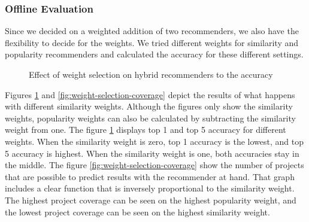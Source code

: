 \subsubsection{Offline Evaluation}

Since we decided on a weighted addition of two recommenders, we also have the flexibility to decide for the weights. We tried different weights for similarity and popularity recommenders and calculated the accuracy for these different settings. 


\begin{figure}[htp]
	\centering
	
	\exampleA
	\exampleB
	\caption[Weight figure]{Effect of weight selection on hybrid recommenders to the accuracy}\label{fig:weight-selection}
\end{figure}

Figures \ref{fig:weight-selection} and \ref{fig:weight-selection-coverage}  depict the results of what happens with different similarity weights. Although the figures only show the similarity weights, popularity weights can also be calculated by subtracting the similarity weight from one. The figure \ref{fig:weight-selection} displays top 1 and top 5 accuracy for different weights. When the similarity weight is zero, top 1 accuracy is the lowest, and top 5 accuracy is highest. When the similarity weight is one, both accuracies stay in the middle. The figure \ref{fig:weight-selection-coverage} show the number of projects that are possible to predict results with the recommender at hand. That graph includes a clear function that is inversely proportional to the similarity weight. The highest project coverage can be seen on the highest popularity weight, and the lowest project coverage can be seen on the highest similarity weight. 

